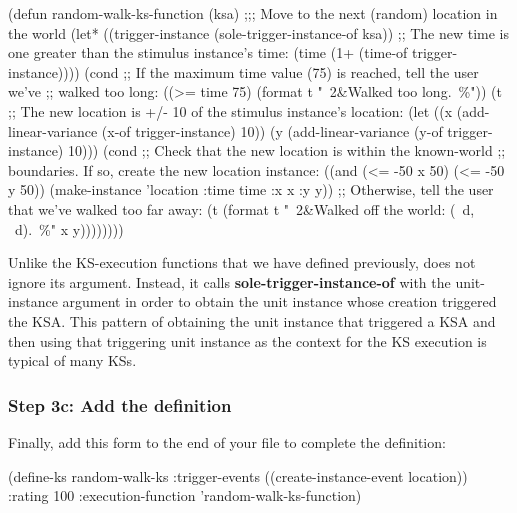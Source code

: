 \documentclass[10pt,twoside,english,pdftex]{article}
\begin{document}
\begin{example}
  (defun random-walk-ks-function (ksa)
    ;;; Move to the next (random) location in the world
    (let* ((trigger-instance (sole-trigger-instance-of ksa))
           ;; The new time is one greater than the stimulus instance's time:
           (time (1+ (time-of trigger-instance))))
      (cond
       ;; If the maximum time value (75) is reached, tell the user we've
       ;; walked too long:
       ((>= time 75) (format t "~2&Walked too long.~\%"))
       (t ;; The new location is +/- 10 of the stimulus instance's location:
        (let ((x (add-linear-variance (x-of trigger-instance) 10))
              (y (add-linear-variance (y-of trigger-instance) 10)))
          (cond
           ;; Check that the new location is within the known-world
           ;; boundaries.  If so, create the new location instance:
           ((and (<= -50 x 50) (<= -50 y 50))
            (make-instance 'location 
              :time time 
              :x x 
              :y y))
           ;; Otherwise, tell the user that we've walked too far away:
           (t (format t "~2&Walked off the world: (~d, ~d).~\%" x y))))))))
\end{example}

%
Unlike the KS-execution functions that we have defined previously,
 does not ignore its  argument.
Instead, it calls \textbf{sole-trigger-instance-of} with the 
unit-instance argument in order to obtain the  unit instance
whose creation triggered the KSA.  This pattern of obtaining the unit instance
that triggered a KSA and then using that triggering unit instance as the
context for the KS execution is typical of many KSs. 

\subsubsection*{Step 3c: Add the  definition}

Finally, add this  form to the end of your
 file to complete the 
definition:

%
%
\begin{example}
  (define-ks random-walk-ks
     :trigger-events ((create-instance-event location))
     :rating 100
     :execution-function 'random-walk-ks-function)
\end{example}
\end{document}
